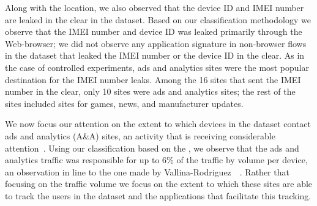 Along with the location, we also observed that the device ID and IMEI number are leaked in the clear in the \mobWild dataset. 
Based on our classification methodology we observe that the IMEI number and device ID was leaked primarily through the Web-browser; we did not observe any application signature in non-browser flows in the \mobWild dataset that leaked the IMEI number or the device ID in the clear. 
As in the case of controlled experiments, ads and analytics sites were the most popular destination for the IMEI number leaks.
Among the 16 sites that sent the IMEI number in the clear, only 10 sites were ads and analytics sites; the rest of the sites included sites for games, news, and manufacturer updates.







We now focus our attention on the extent to which devices in the \mobWild dataset contact ads and analytics (A\&A) sites, an activity that is receiving considerable attention~\cite{roesner:webtrackers,leontiadis:mobileads,vallina-rod:ads}.
Using our classification based on the \httphost, we observe that the ads and analytics traffic was responsible for up to 6\% of the traffic by volume per device, an observation in line to the one made by Vallina-Rodriguez~\etal~\cite{vallina-rod:ads}.
Rather that focusing on the traffic volume we focus on the extent to which these sites are able to track the users in the dataset and the applications that facilitate this tracking. 

